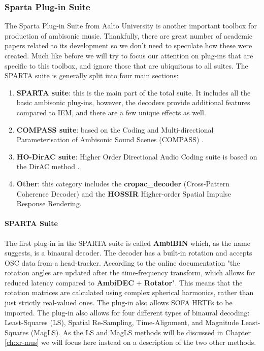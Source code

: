 \subsubsection{Sparta Plug-in Suite}

The Sparta Plug-in Suite from Aalto University is another important toolbox for production of ambisonic music. Thankfully, there are great number of academic papers related to its development so we don't need to speculate how these were created. 
Much like before we will try to focus our attention on plug-ins that are specific to this toolbox, and ignore those that are ubiquitous to all suites. The SPARTA suite is generally split into four main sections:

\begin{enumerate}
    \item \textbf{SPARTA suite}: this is the main part of the total suite. It includes all the basic ambisonic plug-ins, however, the decoders provide additional features compared to IEM, and there are a few unique effects as well.
    
    \item \textbf{COMPASS suite}: based on the Coding and Multi-directional Parameterisation of Ambisonic Sound Scenes (COMPASS) \cite{politis2018compass}. 
    
    \item \textbf{HO-DirAC suite}: Higher Order Directional Audio Coding suite is based on the DirAC method \cite{pulkki2007spatial}.
    
    \item \textbf{Other}: this category includes the \textbf{cropac\_decoder} (Cross-Pattern Coherence Decoder) and the \textbf{HOSSIR} Higher-order Spatial Impulse Response Rendering.
\end{enumerate}

\paragraph{SPARTA Suite}

The first plug-in in the SPARTA suite is called \textbf{AmbiBIN} which, as the name suggests, is a binaural decoder. The decoder has a built-in rotation and accepts OSC data from a head-tracker. According to the online documentation \cite{research75online} "the rotation angles are updated after the time-frequency transform, which allows for reduced latency compared to \textbf{AmbiDEC} + \textbf{Rotator}". This means that the rotation matrices are calculated using complex spherical harmonics, rather than just strictly real-valued ones. The plug-in also allows SOFA \cite{majdak2013spatially} HRTFs to be imported. The plug-in also allows for four different types of binaural decoding: Least-Squares (LS), Spatial Re-Sampling, Time-Alignment, and Magnitude Least-Squares (MagLS). As the LS and MagLS methods will be discussed in Chapter \ref{ch:xr-mus} we will focus here instead on a description of the two other methods. 

